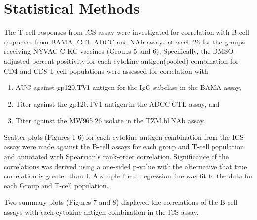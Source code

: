 \documentclass[11pt]{article}\usepackage[]{graphicx}\usepackage[]{color}
\begin{document}
\section{Statistical Methods}
The T-cell responses from ICS assay were investigated for correlation with B-cell responses from BAMA, GTL ADCC and NAb assays at week 26 for the groups receiving NYVAC-C-KC vaccines (Groups 5 and 6). Specifically, the DMSO-adjusted percent positivity for each cytokine-antigen(pooled) combination for CD4 and CD8 T-cell populations were assessed for correlation with 
\begin{enumerate}
\item AUC against gp120.TV1 antigen for the IgG subclass in the BAMA assay,
\item Titer against the gp120.TV1 antigen in the ADCC GTL assay, and
\item Titer against the MW965.26 isolate in the TZM.bl NAb assay.
\end{enumerate}

Scatter plots (Figures 1-6) for each cytokine-antigen combination from the ICS assay were made against the B-cell assays for each group and T-cell population and annotated with Spearman's rank-order correlation. Significance of the correlations was derived using a one-sided p-value with the alternative that true correlation is greater than 0. A simple linear regression line was fit to the data for each Group and T-cell population. 

Two summary plots (Figures 7 and 8) displayed the correlations of the B-cell assays with each cytokine-antigen combination in the ICS assay. 
\end{document}
